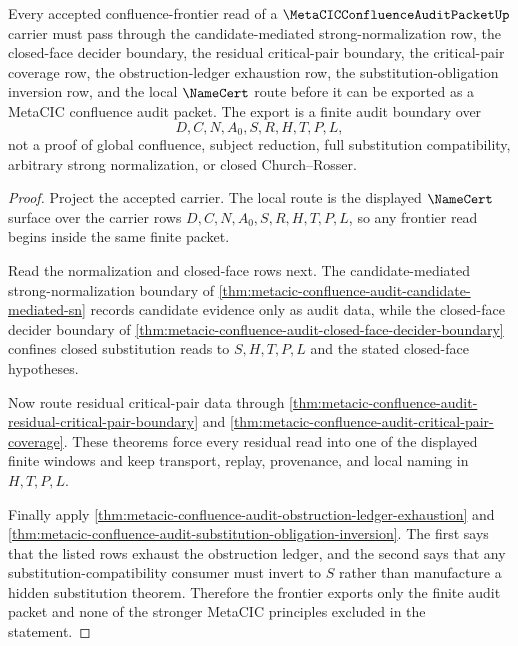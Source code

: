 \begin{theorem}
\label{thm:metacic-confluence-critical-pair-frontier}
Every accepted confluence-frontier read of a $\MetaCICConfluenceAuditPacketUp$ carrier must pass through the candidate-mediated strong-normalization row, the closed-face decider boundary, the residual critical-pair boundary, the critical-pair coverage row, the obstruction-ledger exhaustion row, the substitution-obligation inversion row, and the local $\NameCert$ route before it can be exported as a MetaCIC confluence audit packet. The export is a finite audit boundary over
$$
D,C,N,A_0,S,R,H,T,P,L,
$$
not a proof of global confluence, subject reduction, full substitution compatibility, arbitrary strong normalization, or closed Church--Rosser.
\end{theorem}
\begin{proof}
Project the accepted carrier. The local route is the displayed $\NameCert$ surface over the carrier rows $D,C,N,A_0,S,R,H,T,P,L$, so any frontier read begins inside the same finite packet.

Read the normalization and closed-face rows next. The candidate-mediated strong-normalization boundary of \autoref{thm:metacic-confluence-audit-candidate-mediated-sn} records candidate evidence only as audit data, while the closed-face decider boundary of \autoref{thm:metacic-confluence-audit-closed-face-decider-boundary} confines closed substitution reads to $S,H,T,P,L$ and the stated closed-face hypotheses.

Now route residual critical-pair data through \autoref{thm:metacic-confluence-audit-residual-critical-pair-boundary} and \autoref{thm:metacic-confluence-audit-critical-pair-coverage}. These theorems force every residual read into one of the displayed finite windows and keep transport, replay, provenance, and local naming in $H,T,P,L$.

Finally apply \autoref{thm:metacic-confluence-audit-obstruction-ledger-exhaustion} and \autoref{thm:metacic-confluence-audit-substitution-obligation-inversion}. The first says that the listed rows exhaust the obstruction ledger, and the second says that any substitution-compatibility consumer must invert to $S$ rather than manufacture a hidden substitution theorem. Therefore the frontier exports only the finite audit packet and none of the stronger MetaCIC principles excluded in the statement.
\end{proof}

